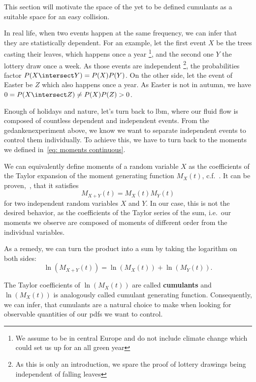 
This section will motivate the space of the yet to be defined cumulants as a suitable space for an easy collision.

In real life, when two events happen at the same frequency, we can infer that they are statistically dependent.
For an example, let the first event $X$ be the trees casting their leaves, which happens once a year
\footnote{We assume to be in central Europe and do not include climate change which could set us up for an all green year},
and the second one $Y$ the lottery draw once a week.
As those events are independent
\footnote{As this is only an introduction, we spare the proof of lottery drawings being independent of falling leaves},
the probabilities factor $P(X\intersect Y) = P(X)P(Y)$.
On the other side, let the event of Easter be $Z$ which also happens once a year.
As Easter is not in autumn, we have $0 = P(X\intersect Z) \neq P(X)P(Z) > 0$.

Enough of holidays and nature, let's turn back to \gls{lbm}, where our fluid flow is composed of countless dependent and independent events.
From the gedankenexperiment above, we know we want to separate independent events to control them individually.
To achieve this, we have to turn back to the moments we defined in~\eqref{eq: moments continuous}.

We can equivalently define moments of a random variable $X$ as the coefficients of the Taylor expansion of the moment generating function $M_X(t)$, c.f.~\cite{weissteinMGF}.
It can be proven,~\cite{weissteinMGF}, that it satisfies
\begin{equation}
\label{eq: moment generating function for independent variables}
  M_{X+Y}(t) = M_{X}(t)M_{Y}(t)
\end{equation}
for two independent random variables $X$ and $Y$.
In our case, this is not the desired behavior, as the coefficients of the Taylor series of the sum, i.e.\ our moments we observe are composed of moments of different order from the individual variables.

As a remedy, we can turn the product into a sum by taking the logarithm on both sides:
\begin{equation}
  \label{eq: cumulant generating function for independent variables}
  \ln(M_{X+Y}(t)) = \ln(M_{X}(t)) + \ln(M_{Y}(t)).
\end{equation}

The Taylor coefficients of $\ln(M_X(t))$ are called \textbf{cumulants} and $\ln(M_{X}(t))$ is analogously called cumulant generating function.
Consequently, we can infer, that cumulants are a natural choice to make when looking for observable quantities of our \glspl{pdf} we want to control.

